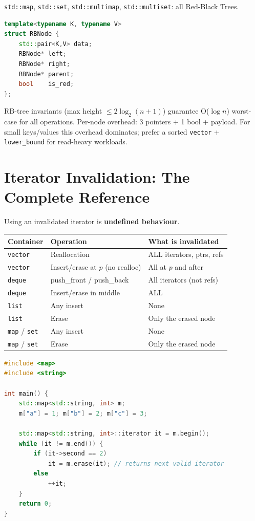 \texttt{std::map}, \texttt{std::set}, \texttt{std::multimap}, \texttt{std::multiset}: all Red-Black Trees.

\begin{lstlisting}[language=C++, caption={Conceptual RB-tree node}]
template<typename K, typename V>
struct RBNode {
    std::pair<K,V> data;
    RBNode* left;
    RBNode* right;
    RBNode* parent;
    bool    is_red;
};
\end{lstlisting}

RB-tree invariants (max height \(\le 2\log_2(n+1)\)) guarantee O(\(\log n\)) worst-case for all operations. Per-node overhead: 3 pointers + 1 bool + payload. For small keys/values this overhead dominates; prefer a sorted \texttt{vector} + \texttt{lower\_bound} for read-heavy workloads.

\section{Iterator Invalidation: The Complete Reference}
\label{sec:iterator-invalidation}

Using an invalidated iterator is \textbf{undefined behaviour}.

\begin{center}
\begin{tabular}{|l|l|l|}
\hline
\textbf{Container} & \textbf{Operation} & \textbf{What is invalidated} \\
\hline
\texttt{vector} & Reallocation & ALL iterators, ptrs, refs \\
\texttt{vector} & Insert/erase at \(p\) (no realloc) & All at \(p\) and after \\
\texttt{deque} & push\_front / push\_back & All iterators (not refs) \\
\texttt{deque} & Insert/erase in middle & ALL \\
\texttt{list} & Any insert & None \\
\texttt{list} & Erase & Only the erased node \\
\texttt{map} / \texttt{set} & Any insert & None \\
\texttt{map} / \texttt{set} & Erase & Only the erased node \\
\hline
\end{tabular}
\end{center}

\begin{lstlisting}[language=C++, caption={Safe erase during iteration --- map}]
#include <map>
#include <string>

int main() {
    std::map<std::string, int> m;
    m["a"] = 1; m["b"] = 2; m["c"] = 3;

    std::map<std::string, int>::iterator it = m.begin();
    while (it != m.end()) {
        if (it->second == 2)
            it = m.erase(it); // returns next valid iterator
        else
            ++it;
    }
    return 0;
}
\end{lstlisting}

